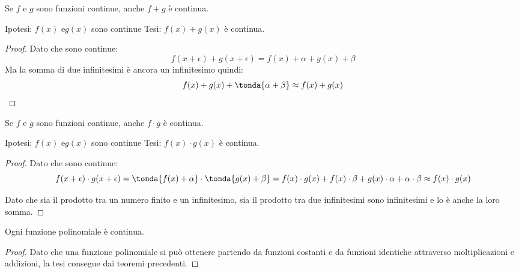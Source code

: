 \begin{teorema}
Se \(f\) e \(g\) sono funzioni continue, anche \(f+g\) è continua.
\end{teorema}

\noindent Ipotesi: 
\(f(x) \text{ e} g(x)\) sono continue
\tab Tesi: 
\(f(x)+g(x)\) è continua.

\begin{proof}
Dato che sono continue: 
\[f(x+\epsilon) + g(x+\epsilon) = f(x)+\alpha + g(x)+\beta\]
Ma la somma di due infinitesimi è ancora un infinitesimo quindi:
\[f(x)+g(x)+\tonda{\alpha + \beta} \approx f(x)+g(x)\]
\end{proof}

\begin{teorema}
Se \(f\) e \(g\) sono funzioni continue, anche \(f \cdot g\) è continua.
\end{teorema}

\noindent Ipotesi: 
\(f(x) \text{ e} g(x)\) sono continue
\tab Tesi: 
\(f(x) \cdot g(x)\) è continua.

\begin{proof}
Dato che sono continue: 
\[f(x+\epsilon) \cdot g(x+\epsilon) = 
\tonda{f(x)+\alpha} \cdot \tonda{g(x)+\beta} = 
f(x) \cdot g(x) + f(x) \cdot \beta + g(x) \cdot \alpha + \alpha \cdot \beta
\approx f(x) \cdot g(x)\]

Dato che sia il prodotto tra un numero finito e un infinitesimo, sia il 
prodotto tra due infinitesimi sono infinitesimi e lo è anche la loro somma. 
\end{proof}

\begin{corollario}
 Ogni funzione polinomiale è continua.
\end{corollario}

\begin{proof}
Dato che una funzione polinomiale si può ottenere partendo da funzioni 
costanti e da funzioni identiche attraverso moltiplicazioni e addizioni, 
la tesi consegue dai teoremi precedenti. 
\end{proof}

